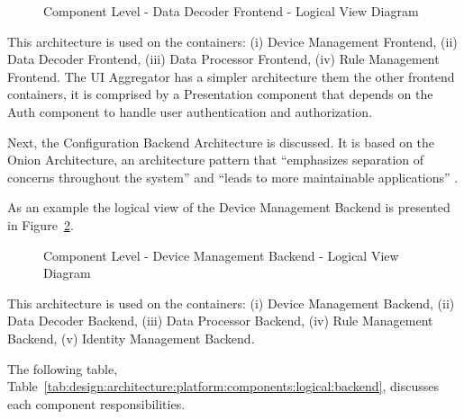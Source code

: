 \begin{figure}[H]
   \centering
   \resizebox{0.7\columnwidth}{!}
   {
      
   }
   \caption[Component Level - Data Decoder Frontend - Logical View Diagram]{Component Level - Data Decoder Frontend - Logical View Diagram}
   \label{fig:design:architecture:platform:component:logical:diagram:decoder}
\end{figure}

This architecture is used on the containers: (i) Device Management Frontend, (ii) Data Decoder Frontend, (iii) Data Processor Frontend, (iv) Rule Management Frontend. The UI Aggregator has a simpler architecture them the other frontend containers, it is comprised by a Presentation component that depends on the Auth component to handle user authentication and authorization.

Next, the Configuration Backend Architecture is discussed. It is based on the Onion Architecture, an architecture pattern that ``emphasizes separation of concerns throughout the system'' and ``leads to more maintainable applications'' \parencite{onion}.

As an example the logical view of the Device Management Backend is presented in Figure~\ref{fig:design:architecture:platform:component:logical:diagram:device}.

\begin{figure}[H]
   \centering
   \resizebox{0.8\columnwidth}{!}
   {
      
   }
   \caption[Component Level - Device Management Backend - Logical View Diagram]{Component Level - Device Management Backend - Logical View Diagram}
   \label{fig:design:architecture:platform:component:logical:diagram:device}
\end{figure}

This architecture is used on the containers: (i) Device Management Backend, (ii) Data Decoder Backend, (iii) Data Processor Backend, (iv) Rule Management Backend, (v) Identity Management Backend.

The following table, Table~\ref{tab:design:architecture:platform:components:logical:backend}, discusses each component responsibilities.

